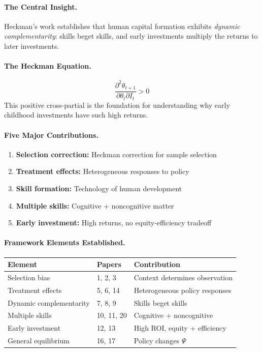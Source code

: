 \documentclass[12pt,a4paper]{article}
\begin{document}
\paragraph{The Central Insight.}
Heckman's work establishes that human capital formation exhibits
\emph{dynamic complementarity}: skills beget skills, and early investments
multiply the returns to later investments.

\paragraph{The Heckman Equation.}
\begin{equation}
  \frac{\partial^2 \theta_{t+1}}{\partial \theta_t \partial I_t} > 0
\end{equation}
This positive cross-partial is the foundation for understanding why
early childhood investments have such high returns.

\paragraph{Five Major Contributions.}

\begin{enumerate}
  \item \textbf{Selection correction:} Heckman correction for sample selection
  \item \textbf{Treatment effects:} Heterogeneous responses to policy
  \item \textbf{Skill formation:} Technology of human development
  \item \textbf{Multiple skills:} Cognitive + noncognitive matter
  \item \textbf{Early investment:} High returns, no equity-efficiency tradeoff
\end{enumerate}

\paragraph{Framework Elements Established.}

\begin{center}
\renewcommand{\arraystretch}{1.2}
\small
\begin{tabular}{lll}
\hline
\textbf{Element} & \textbf{Papers} & \textbf{Contribution} \\
\hline
Selection bias & 1, 2, 3 & Context determines observation \\
Treatment effects & 5, 6, 14 & Heterogeneous policy responses \\
Dynamic complementarity & 7, 8, 9 & Skills beget skills \\
Multiple skills & 10, 11, 20 & Cognitive + noncognitive \\
Early investment & 12, 13 & High ROI, equity + efficiency \\
General equilibrium & 16, 17 & Policy changes $\Psi$ \\
\hline
\end{tabular}
\end{center}
\end{document}
